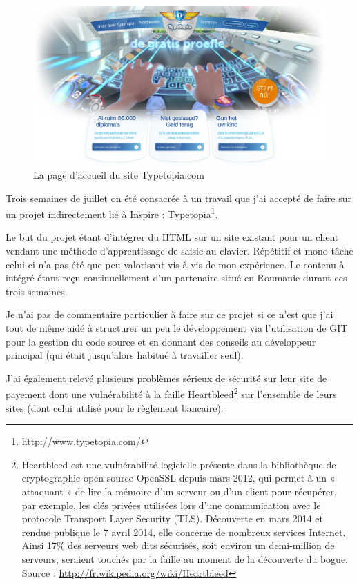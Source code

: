 \documentclass[12pt,a4paper]{book}
\begin{document}
\begin{figure}[htp]
\centering
\includegraphics[scale=0.3]{img/typetopia.png}
 \caption{La page d'accueil du site Typetopia.com}
 \label{fig.typetopia}
\end{figure}

Trois semaines de juillet on été consacrée à un travail que j'ai accepté de faire sur un projet indirectement lié à Inspire : Typetopia\footnote{\url{http://www.typetopia.com/}}.

Le but du projet étant d'intégrer du HTML sur un site existant pour un client vendant une méthode d'apprentissage de saisie au clavier. Répétitif et mono-tâche celui-ci n'a pas été que peu valorisant vis-à-vis de mon expérience. Le contenu à intégré étant reçu continuellement d'un partenaire situé en Roumanie durant ces trois semaines.

Je n'ai pas de commentaire particulier à faire sur ce projet si ce n'est que j'ai tout de même aidé à structurer un peu le développement via l'utilisation de GIT pour la gestion du code source et en donnant des conseils au développeur principal (qui était jusqu'alors habitué à travailler seul).

J'ai également relevé plusieurs problèmes sérieux de sécurité sur leur site de payement dont une vulnérabilité à la faille Heartbleed\footnote{Heartbleed est une vulnérabilité logicielle présente dans la bibliothèque de cryptographie open source OpenSSL depuis mars 2012, qui permet à un « attaquant » de lire la mémoire d'un serveur ou d'un client pour récupérer, par exemple, les clés privées utilisées lors d'une communication avec le protocole Transport Layer Security (TLS). Découverte en mars 2014 et rendue publique le 7 avril 2014, elle concerne de nombreux services Internet. Ainsi 17\% des serveurs web dits sécurisés, soit environ un demi-million de serveurs, seraient touchés par la faille au moment de la découverte du bogue. Source : \url{http://fr.wikipedia.org/wiki/Heartbleed}} sur l'ensemble de leurs sites (dont celui utilisé pour le règlement bancaire).
\end{document}
